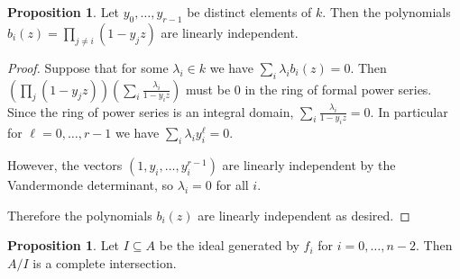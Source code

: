 \documentclass{amsart}
\numberwithin{equation}{section}
\theoremstyle{definition}
\newtheorem{proposition}[equation]{Proposition}
\begin{document}
\begin{proposition}\label{prop:vand}Let $y_0, \ldots, y_{r - 1}$ be distinct elements of $k$.  Then the polynomials $b_i(z) = \prod_{j \neq i} (1 - y_j z)$ are linearly independent.
\end{proposition}
\begin{proof} 
Suppose that for some $\lambda_i \in k$ we have $\sum_i \lambda_ib_i(z)=0$.  Then $\left(\prod_j (1-y_jz)\right)\left(\sum_i \frac{\lambda_i}{1-y_iz}\right)$ must be $0$ in the ring of formal power series. Since the ring of power series is an integral domain, $\sum_i \frac{\lambda_i}{1-y_iz}=0$. In particular for $\ell=0,\dots,r-1$ we have $\sum_i \lambda_iy_i^\ell=0$. 

However, the vectors $(1,y_i,\dots,y_i^{r-1})$ are linearly independent by the Vandermonde determinant, so $\lambda_i=0$ for all $i$.

Therefore the polynomials $b_i(z)$ are linearly independent as desired.
\end{proof}

\begin{proposition}\label{prop:ci} Let $I \subseteq A$ be the ideal generated by $f_i$ for $i=0,\dots,n-2$.  Then $A/I$ is a complete intersection. 
\end{proposition}
\end{document}
